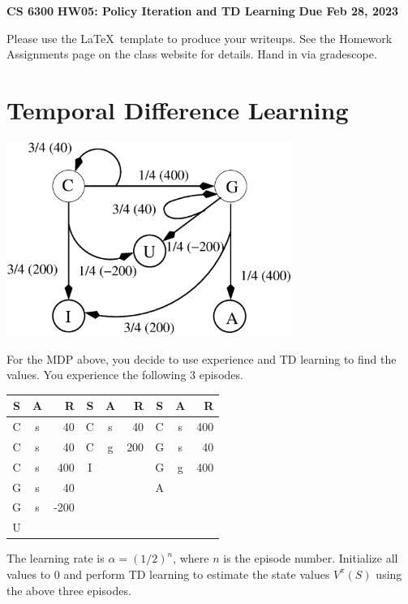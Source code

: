 \documentclass[12pt]{article}
\begin{document}
\begin{center}
{\bf CS 6300} \hfill {\large\bf HW05: Policy Iteration and TD Learning} \hfill {\bf Due Feb 28, 2023}
\end{center}

\noindent
Please use the \LaTeX\ template to produce your writeups. See the
Homework Assignments page on the class website for details.  Hand in
via gradescope.


\section{Temporal Difference Learning}

  \begin{center}
  \includegraphics[height=2.5in]{cgiau.eps}
  \end{center}

For the MDP above, you decide to use experience and TD learning to
find the values.  You experience the following 3 episodes.

\begin{center}
\begin{tabular}{ccr|ccr|ccr} \hline
S & A & R    & S & A & R   & S & A & R   \\ \hline
C & s & 40   & C & s & 40  & C & s & 400 \\
C & s & 40   & C & g & 200 & G & s & 40  \\
C & s & 400  & I &   &     & G & g & 400 \\
G & s & 40   &   &   &     & A &   &     \\
G & s & -200 &   &   &     &   &   &     \\
U &   &      &   &   &     &   &   &
\end{tabular}
\end{center}

\noindent
The learning rate is $\alpha = (1/2)^n$, where $n$ is the episode number. Initialize all values to 0 and perform TD learning to estimate the state values $V^{\pi}(S)$ using the above three episodes.
\end{document}
